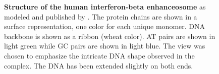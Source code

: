 \begin{center}
    \begin{figure}[H]
        \caption[Structure of the human interferon-beta enhanceosome]{\textbf{ Structure of the human interferon-beta enhanceosome} as modeled and published by \citet{panne2007atomic}. The protein chains are shown in a surface representation, one color for each unique monomer. DNA backbone is shown as a ribbon (wheat color). AT pairs are shown in light green while GC pairs are shown in light blue. The view was chosen to emphasize the intricate DNA shape observed in the complex. The DNA has been extended slightly on both ends.}
  \label{fig:mmc2}
\end{figure}
\end{center}
